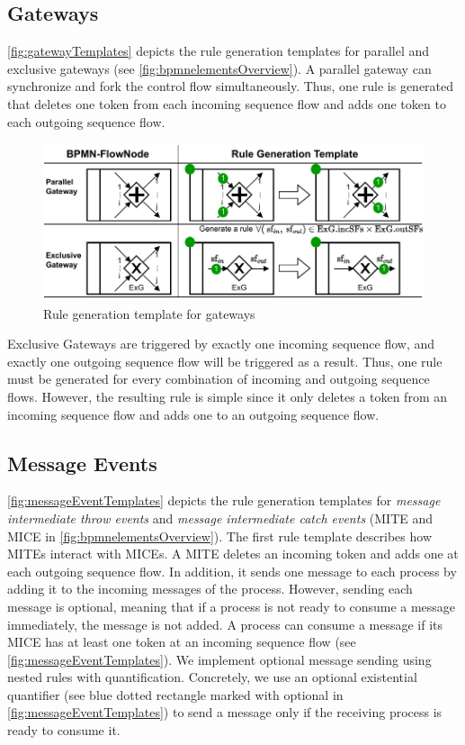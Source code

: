\documentclass[runningheads]{llncs}
\begin{document}
\subsection{Gateways}
\autoref{fig:gatewayTemplates} depicts the rule generation templates for parallel and exclusive gateways (see \autoref{fig:bpmnelementsOverview}).
A parallel gateway can synchronize and fork the control flow simultaneously.
Thus, one rule is generated that deletes one token from each incoming sequence flow and adds one token to each outgoing sequence flow.

\begin{figure}[ht]
    \centering
    \includegraphics[width=1\textwidth]{images/gateways_template.pdf}
    \caption{Rule generation template for gateways}
    \label{fig:gatewayTemplates}
\end{figure}

Exclusive Gateways are triggered by exactly one incoming sequence flow, and exactly one outgoing sequence flow will be triggered as a result.
Thus, one rule must be generated for every combination of incoming and outgoing sequence flows.
However, the resulting rule is simple since it only deletes a token from an incoming sequence flow and adds one to an outgoing sequence flow.

\subsection{Message Events}
\autoref{fig:messageEventTemplates} depicts the rule generation templates for \textit{message intermediate throw events} and \textit{message intermediate catch events} (\textsf{MITE} and \textsf{MICE} in \autoref{fig:bpmnelementsOverview}).
The first rule template describes how MITEs interact with MICEs.
A MITE deletes an incoming token and adds one at each outgoing sequence flow.
In addition, it sends one message to each process by adding it to the incoming messages of the process.
However, sending each message is optional, meaning that if a process is not ready to consume a message immediately, the message is not added.
A process can consume a message if its MICE has at least one token at an incoming sequence flow (see \autoref{fig:messageEventTemplates}).
We implement optional message sending using nested rules with quantification.
Concretely, we use an optional existential quantifier \cite{rensinkNestedQuantificationGraph2006} (see blue dotted rectangle marked with optional in \autoref{fig:messageEventTemplates}) to send a message only if the receiving process is ready to consume it.
\end{document}
